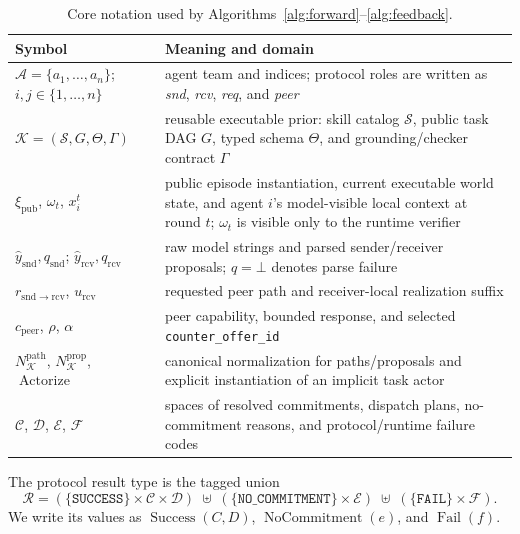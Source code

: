 \documentclass[10pt]{article}
\newcommand{\tabstyle}{\small\setlength{\tabcolsep}{2.5pt}\renewcommand{\arraystretch}{1.10}}
\newcommand{\thead}[1]{\textbf{#1}}
\newcommand{\artifact}[1]{\texttt{#1}}
\begin{document}
\begin{table}[!htbp]
  \centering
  \caption{Core notation used by Algorithms~\ref{alg:forward}--\ref{alg:feedback}.}
  \label{tab:core-notation}
  \tabstyle
  \begin{tabularx}{\textwidth}{L{3.55cm} Z}
    \toprule
    \thead{Symbol} & \thead{Meaning and domain} \\
    \midrule
    $\mathcal A=\{a_1,\ldots,a_n\}$; $i,j\in\{1,\ldots,n\}$ & agent team and indices; protocol roles are written as \emph{snd}, \emph{rcv}, \emph{req}, and \emph{peer} \\
    $\mathcal K=(\mathcal S,G,\Theta,\Gamma)$ & reusable executable prior: skill catalog $\mathcal S$, public task DAG $G$, typed schema $\Theta$, and grounding/checker contract $\Gamma$ \\
    $\xi_{\mathrm{pub}}$, $\omega_t$, $x_i^t$ & public episode instantiation, current executable world state, and agent $i$'s model-visible local context at round $t$; $\omega_t$ is visible only to the runtime verifier \\
    $\hat y_{\mathrm{snd}},q_{\mathrm{snd}}$; $\hat y_{\mathrm{rcv}},q_{\mathrm{rcv}}$ & raw model strings and parsed sender/receiver proposals; $q=\bot$ denotes parse failure \\
    $r_{\mathrm{snd}\rightarrow\mathrm{rcv}}$, $u_{\mathrm{rcv}}$ & requested peer path and receiver-local realization suffix \\
    $c_{\mathrm{peer}}$, $\rho$, $\alpha$ & peer capability, bounded response, and selected \artifact{counter\_offer\_id} \\
    $N_{\mathcal K}^{\mathrm{path}}$, $N_{\mathcal K}^{\mathrm{prop}}$, $\operatorname{Actorize}$ & canonical normalization for paths/proposals and explicit instantiation of an implicit task actor \\
    $\mathcal C$, $\mathcal D$, $\mathcal E$, $\mathcal F$ & spaces of resolved commitments, dispatch plans, no-commitment reasons, and protocol/runtime failure codes \\
    \bottomrule
  \end{tabularx}
\end{table}

The protocol result type is the tagged union
\[
\mathcal R=
(\{\mathtt{SUCCESS}\}\times\mathcal C\times\mathcal D)
\;\uplus\;
(\{\mathtt{NO\_COMMITMENT}\}\times\mathcal E)
\;\uplus\;
(\{\mathtt{FAIL}\}\times\mathcal F).
\]
We write its values as $\operatorname{Success}(C,D)$, $\operatorname{NoCommitment}(e)$, and $\operatorname{Fail}(f)$.
\end{document}
